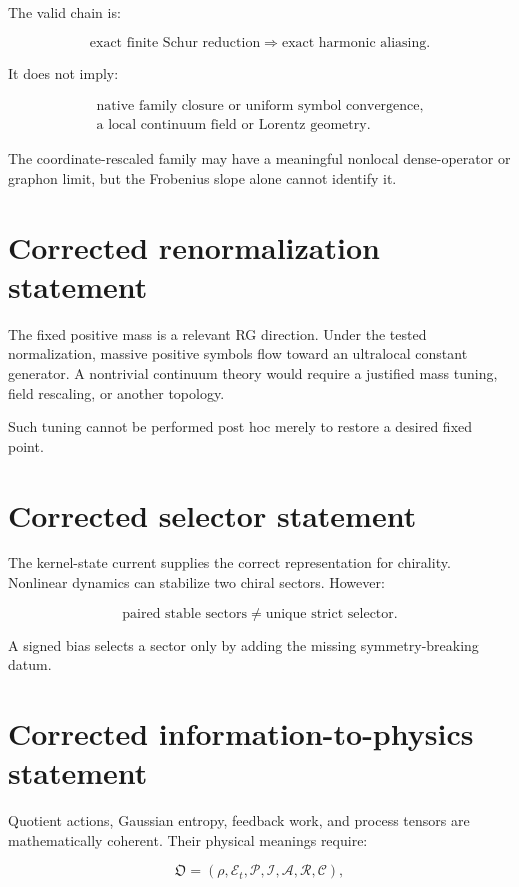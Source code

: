 \documentclass[11pt,a4paper,openany]{report}
\begin{document}
The valid chain is:

\[
\text{exact finite Schur reduction}
\Longrightarrow
\text{exact harmonic aliasing}.
\]

It does not imply:

\[
\begin{gathered}
\text{native family closure or uniform symbol convergence},\\
\text{a local continuum field or Lorentz geometry}.
\end{gathered}
\]

The coordinate-rescaled family may have a meaningful nonlocal dense-operator or graphon limit, but the Frobenius slope alone cannot identify it.

\section{Corrected renormalization statement}

The fixed positive mass is a relevant RG direction. Under the tested normalization, massive positive symbols flow toward an ultralocal constant generator. A nontrivial continuum theory would require a justified mass tuning, field rescaling, or another topology.

Such tuning cannot be performed post hoc merely to restore a desired fixed point.

\section{Corrected selector statement}

The kernel-state current supplies the correct representation for chirality. Nonlinear dynamics can stabilize two chiral sectors. However:

\[
\text{paired stable sectors}
\ne
\text{unique strict selector}.
\]

A signed bias selects a sector only by adding the missing symmetry-breaking datum.

\section{Corrected information-to-physics statement}

Quotient actions, Gaussian entropy, feedback work, and process tensors are mathematically coherent. Their physical meanings require:

\[
\mathfrak O
=
(\rho,\mathcal E_t,\mathcal P,\mathcal I,\mathcal A,\mathcal R,\mathcal C),
\]
\end{document}
